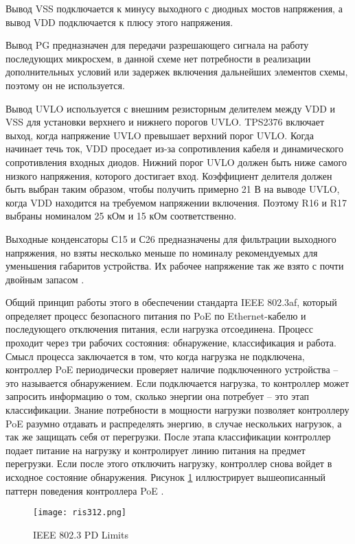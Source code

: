 Вывод VSS подключается к минусу выходного с диодных мостов напряжения, 
а вывод VDD подключается к плюсу этого напряжения.

Вывод PG предназначен для передачи разрешающего сигнала на работу последующих микросхем,
в данной схеме нет потребности в реализации дополнительных условий или задержек включения
дальнейших элементов схемы, поэтому он не используется.

Вывод UVLO используется с внешним резисторным делителем между VDD и VSS для установки 
верхнего и нижнего порогов UVLO. TPS2376 включает выход, когда напряжение UVLO превышает верхний 
порог UVLO. Когда начинает течь ток, VDD проседает из-за сопротивления кабеля и динамического 
сопротивления входных диодов. Нижний порог UVLO должен быть ниже самого низкого напряжения, 
которого достигает вход. Коэффициент делителя должен быть выбран таким образом, 
чтобы получить примерно 21 В на выводе UVLO, когда VDD находится на требуемом 
напряжении включения. Поэтому R16 и R17 выбраны номиналом 25 кОм и 15 кОм соответственно.

Выходные конденсаторы С15 и С26 предназначены для фильтрации выходного напряжения, но взяты 
несколько меньше по номиналу рекомендуемых для уменьшения габаритов устройства. Их рабочее
напряжение так же взято с почти двойным запасом \cite{TPS2376:datasheet}.

Общий принцип работы этого в обеспечении стандарта IEEE 802.3af, который определяет 
процесс безопасного питания по PoE по Ethernet-кабелю и последующего отключения питания, 
если нагрузка отсоединена. Процесс проходит через три рабочих состояния: обнаружение, 
классификация и работа. Смысл процесса заключается в том, что когда нагрузка не подключена,
контроллер PoE периодически проверяет наличие подключенного устройства -- это называется 
обнаружением. Если подключается нагрузка, то контроллер может запросить информацию о том,
сколько энергии она потребует -- это этап классификации. Знание потребности в мощности нагрузки 
позволяет контроллеру PoE разумно отдавать и распределять энергию, в случае нескольких нагрузок,
а так же защищать себя от перегрузки. После этапа классификации контроллер подает питание на 
нагрузку и контролирует линию питания на предмет перегрузки. Если после этого отключить нагрузку,
контроллер снова войдет в исходное состояние обнаружения. Рисунок \ref{ris:312}  иллюстрирует 
вышеописанный паттерн поведения контроллера PoE \cite{TPS2376:datasheet}.

\begin{figure}[H]
    \centering
    \texttt{[image: ris312.png]}
    \caption{IEEE 802.3 PD Limits}
    \label{ris:312}
\end{figure}

